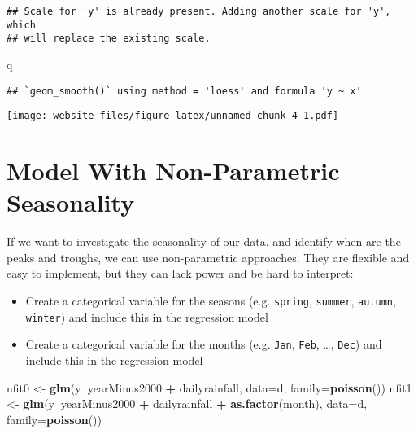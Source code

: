 \documentclass[]{book}
\newenvironment{Shaded}{\begin{snugshade}}{\end{snugshade}}
\newcommand{\KeywordTok}[1]{\textcolor[rgb]{0.13,0.29,0.53}{\textbf{#1}}}
\newcommand{\DataTypeTok}[1]{\textcolor[rgb]{0.13,0.29,0.53}{#1}}
\newcommand{\StringTok}[1]{\textcolor[rgb]{0.31,0.60,0.02}{#1}}
\newcommand{\OperatorTok}[1]{\textcolor[rgb]{0.81,0.36,0.00}{\textbf{#1}}}
\newcommand{\NormalTok}[1]{#1}
\providecommand{\tightlist}{%
  \setlength{\itemsep}{0pt}\setlength{\parskip}{0pt}}
\begin{document}
\begin{verbatim}
## Scale for 'y' is already present. Adding another scale for 'y', which
## will replace the existing scale.
\end{verbatim}

\begin{Shaded}
\begin{Highlighting}[]
\NormalTok{q}
\end{Highlighting}
\end{Shaded}

\begin{verbatim}
## `geom_smooth()` using method = 'loess' and formula 'y ~ x'
\end{verbatim}

\texttt{[image: website\_files/figure-latex/unnamed-chunk-4-1.pdf]}

\section{Model With Non-Parametric
Seasonality}\label{model-with-non-parametric-seasonality}

If we want to investigate the seasonality of our data, and identify when
are the peaks and troughs, we can use non-parametric approaches. They
are flexible and easy to implement, but they can lack power and be hard
to interpret:

\begin{itemize}
\tightlist
\item
  Create a categorical variable for the seasons (e.g. \texttt{spring},
  \texttt{summer}, \texttt{autumn}, \texttt{winter}) and include this in
  the regression model
\item
  Create a categorical variable for the months (e.g. \texttt{Jan},
  \texttt{Feb}, \ldots{}, \texttt{Dec}) and include this in the
  regression model
\end{itemize}

\begin{Shaded}
\begin{Highlighting}[]
\NormalTok{nfit0 <-}\StringTok{ }\KeywordTok{glm}\NormalTok{(y}\OperatorTok{~}\NormalTok{yearMinus2000 }\OperatorTok{+}\StringTok{ }\NormalTok{dailyrainfall, }\DataTypeTok{data=}\NormalTok{d, }\DataTypeTok{family=}\KeywordTok{poisson}\NormalTok{())}
\NormalTok{nfit1 <-}\StringTok{ }\KeywordTok{glm}\NormalTok{(y}\OperatorTok{~}\NormalTok{yearMinus2000 }\OperatorTok{+}\StringTok{ }\NormalTok{dailyrainfall }\OperatorTok{+}\StringTok{ }\KeywordTok{as.factor}\NormalTok{(month), }\DataTypeTok{data=}\NormalTok{d, }\DataTypeTok{family=}\KeywordTok{poisson}\NormalTok{())}
\end{Highlighting}
\end{Shaded}
\end{document}
